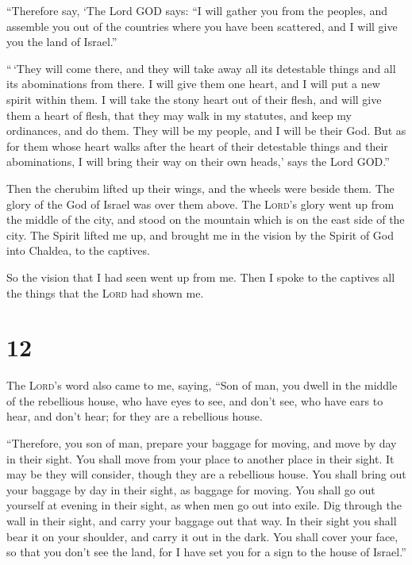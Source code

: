  ``Therefore say, `The Lord GOD says: ``I will gather you
from the peoples, and assemble you out of the countries where you have
been scattered, and I will give you the land of Israel.''

 ``\,`They will come there, and they will take away all
its detestable things and all its abominations from there.
 I will give them one heart, and I will put a new spirit
within them. I will take the stony heart out of their flesh, and will
give them a heart of flesh,  that they may walk in my
statutes, and keep my ordinances, and do them. They will be my people,
and I will be their God.  But as for them whose heart
walks after the heart of their detestable things and their abominations,
I will bring their way on their own heads,' says the Lord GOD.''

 Then the cherubim lifted up their wings, and the wheels
were beside them. The glory of the God of Israel was over them above.
 The \textsc{Lord}'s glory went up from the middle of the
city, and stood on the mountain which is on the east side of the city.
 The Spirit lifted me up, and brought me in the vision by
the Spirit of God into Chaldea, to the captives.

So the vision that I had seen went up from me.  Then I
spoke to the captives all the things that the \textsc{Lord} had shown
me.

\hypertarget{section-11}{%
\section{12}\label{section-11}}

 The \textsc{Lord}'s word also came to me, saying,
 ``Son of man, you dwell in the middle of the rebellious
house, who have eyes to see, and don't see, who have ears to hear, and
don't hear; for they are a rebellious house.

 ``Therefore, you son of man, prepare your baggage for
moving, and move by day in their sight. You shall move from your place
to another place in their sight. It may be they will consider, though
they are a rebellious house.  You shall bring out your
baggage by day in their sight, as baggage for moving. You shall go out
yourself at evening in their sight, as when men go out into exile.
 Dig through the wall in their sight, and carry your
baggage out that way.  In their sight you shall bear it on
your shoulder, and carry it out in the dark. You shall cover your face,
so that you don't see the land, for I have set you for a sign to the
house of Israel.''

